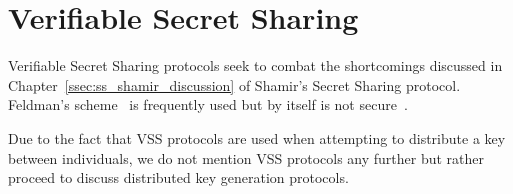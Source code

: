

\section{Verifiable Secret Sharing}
\label{sec:ss_verifiable}

Verifiable Secret Sharing protocols seek to combat the shortcomings
discussed in Chapter~\ref{ssec:ss_shamir_discussion}
of Shamir's Secret Sharing protocol.
Feldman's scheme~\cite{feldman1987practical}
is frequently used but by itself is not
secure~\cite{gennaro1999secure,gennaro2002revisiting}.

Due to the fact that VSS protocols are used when attempting to distribute
a key between individuals,
we do not mention VSS protocols any further but rather
proceed to discuss \gls{distributed key generation} protocols.




